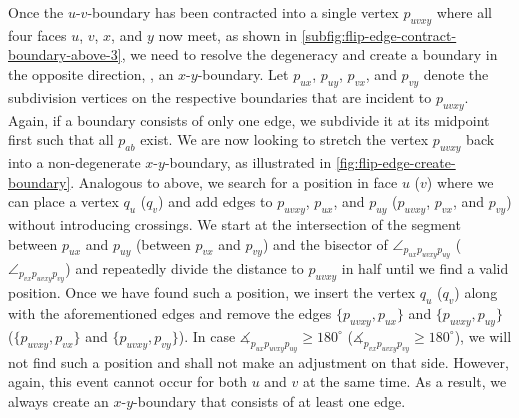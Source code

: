 Once the $u$-$v$-boundary has been contracted into a single vertex $p_{uvxy}$ where all four faces $u$, $v$, $x$, and $y$ now meet, as shown in \cref{subfig:flip-edge-contract-boundary-above-3}, we need to resolve the degeneracy and create a boundary in the opposite direction, \ie{}, an $x$-$y$-boundary.
Let $p_{ux}$, $p_{uy}$, $p_{vx}$, and $p_{vy}$ denote the subdivision vertices on the respective boundaries that are incident to $p_{uvxy}$.
Again, if a boundary consists of only one edge, we subdivide it at its midpoint first such that all $p_{ab}$ exist.
We are now looking to stretch the vertex $p_{uvxy}$ back into a non-degenerate $x$-$y$-boundary, as illustrated in \cref{fig:flip-edge-create-boundary}.
Analogous to above, we search for a position in face $u$ ($v$) where we can place a vertex $q_u$ ($q_v$) and add edges to $p_{uvxy}$, $p_{ux}$, and $p_{uy}$ ($p_{uvxy}$, $p_{vx}$, and $p_{vy}$) without introducing crossings.
We start at the intersection of the segment between $p_{ux}$ and $p_{uy}$ (between $p_{vx}$ and $p_{vy}$) and the bisector of $\angle_{p_{ux}p_{uvxy}p_{uy}}$ ($\angle_{p_{vx}p_{uvxy}p_{vy}}$) and repeatedly divide the distance to $p_{uvxy}$ in half until we find a valid position.
Once we have found such a position, we insert the vertex $q_u$ ($q_v$) along with the aforementioned edges and remove the edges $\{p_{uvxy},p_{ux}\}$ and $\{p_{uvxy},p_{uy}\}$ ($\{p_{uvxy},p_{vx}\}$ and $\{p_{uvxy},p_{vy}\}$).
In case $\measuredangle_{p_{ux}p_{uvxy}p_{uy}} \geq 180^\circ$ ($\measuredangle_{p_{vx}p_{uvxy}p_{vy}} \geq 180^\circ$), we will not find such a position and shall not make an adjustment on that side.
However, again, this event cannot occur for both $u$ and $v$ at the same time.
As a result, we always create an $x$-$y$-boundary that consists of at least one edge.

